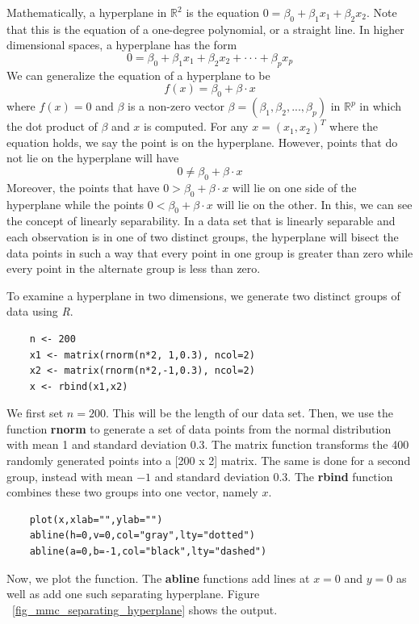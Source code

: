 \documentclass[12pt]{article}
\newcommand{\R}{\mathbb{R}}
\begin{document}
Mathematically, a hyperplane in $\R^2$ is the equation $0=\beta_0+\beta_1x_1+\beta_2x_2$. Note that this is the equation of a one-degree polynomial, or a straight line. In higher dimensional spaces, a hyperplane has the form $$0=\beta_0 + \beta_1 x_1 + \beta_2 x_2 + \cdot \cdot \cdot + \beta_p x_p$$ We can generalize the equation of a hyperplane to be $$f(x)=\beta_0 + \beta \cdot x$$ where $f(x)=0$ and $\beta$ is a non-zero vector $\beta=(\beta_1,\beta_2,...,\beta_p)$ in $\R^p$ in which the dot product of $\beta$ and $x$ is computed. For any $x=(x_1,x_2)^T$ where the equation holds, we say the point is on the hyperplane. However, points that do not lie on the hyperplane will have $$0 \ne \beta_0 + \beta \cdot x$$ Moreover, the points that have $0>\beta_0 + \beta \cdot x$ will lie on one side of the hyperplane while the points $0<\beta_0 + \beta \cdot x$ will lie on the other. In this, we can see the concept of linearly separability. In a data set that is linearly separable and each observation is in one of two distinct groups, the hyperplane will bisect the data points in such a way that every point in one group is greater than zero while every point in the alternate group is less than zero.

To examine a hyperplane in two dimensions, we generate two distinct groups of data using \textit{R}.

\begin{verbatim}
    n <- 200
    x1 <- matrix(rnorm(n*2, 1,0.3), ncol=2)
    x2 <- matrix(rnorm(n*2,-1,0.3), ncol=2)
    x <- rbind(x1,x2)
\end{verbatim}

We first set $n=200$. This will be the length of our data set. Then, we use the function \textbf{rnorm} to generate a set of data points from the normal distribution with mean 1 and standard deviation 0.3. The matrix function transforms the 400 randomly generated points into a [200 x 2] matrix. The same is done for a second group, instead with mean $-1$ and standard deviation 0.3. The \textbf{rbind} function combines these two groups into one vector, namely $x$.

\begin{verbatim}
    plot(x,xlab="",ylab="")
    abline(h=0,v=0,col="gray",lty="dotted")
    abline(a=0,b=-1,col="black",lty="dashed")
\end{verbatim}

Now, we plot the function. The \textbf{abline} functions add lines at $x=0$ and $y=0$ as well as add one such separating hyperplane. Figure ~\ref{fig_mmc_separating_hyperplane} shows the output.
\end{document}
